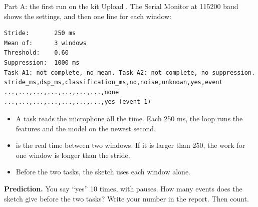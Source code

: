 \begin{frame}[fragile]{Part A: the first run on the kit}
  \small
  Upload . The Serial Monitor at
  115200 baud shows the settings, and then one line for each window:
\begin{lstlisting}
Stride:       250 ms
Mean of:      3 windows
Threshold:    0.60
Suppression:  1000 ms
Task A1: not complete, no mean. Task A2: not complete, no suppression.
stride_ms,dsp_ms,classification_ms,no,noise,unknown,yes,event
...,...,...,...,...,...,...,none
...,...,...,...,...,...,...,yes (event 1)
\end{lstlisting}
  \begin{itemize}
    \item A task reads the microphone all the time. Each 250 ms, the loop
          runs the features and the model on the newest second.
    \item {} is the real time between two windows. If it is
          larger than 250, the work for one window is longer than the
          stride.
    \item Before the two tasks, the sketch uses each window alone.
  \end{itemize}
  \begin{exerciseblock}
    \textbf{Prediction.} You say ``yes'' 10 times, with pauses. How many
    events does the sketch give before the two tasks? Write your number
    in the report. Then count.
  \end{exerciseblock}
\end{frame}

